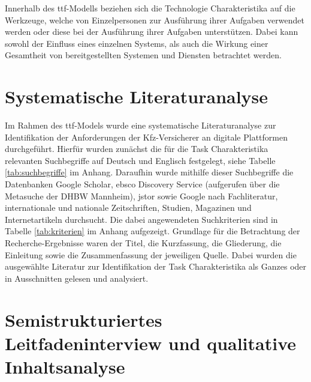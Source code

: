 Innerhalb des \acs{ttf}-Modells beziehen sich die Technologie Charakteristika auf die Werkzeuge, welche von Einzelpersonen zur Ausführung ihrer Aufgaben verwendet werden oder diese bei der Ausführung ihrer Aufgaben unterstützen.\autocite[Vgl.][S. 399]{SPIES2020} Dabei kann sowohl der Einfluss eines einzelnen Systems, als auch die Wirkung einer Gesamtheit von bereitgestellten Systemen und Diensten betrachtet werden. \autocite[Vgl.][S. 216]{GOODHUE1995}





\section{Systematische Literaturanalyse}


Im Rahmen des \acs{ttf}-Models wurde eine systematische Literaturanalyse zur Identifikation der Anforderungen der Kfz-Versicherer an digitale Plattformen durchgeführt. Hierfür wurden zunächst die für die Task Charakteristika relevanten Suchbegriffe auf Deutsch und Englisch festgelegt, siehe Tabelle \ref{tab:suchbegriffe} im Anhang. Daraufhin wurde mithilfe dieser Suchbegriffe die Datenbanken Google Scholar, \ac{ebsco} Discovery Service (aufgerufen über die Metasuche der DHBW Mannheim), \ac{jstor} sowie Google nach Fachliteratur, internationale und nationale Zeitschriften, Studien, Magazinen und Internetartikeln durchsucht. Die dabei angewendeten Suchkriterien sind in Tabelle \ref{tab:kriterien} im Anhang aufgezeigt. Grundlage für die Betrachtung der Recherche-Ergebnisse waren der Titel, die Kurzfassung, die Gliederung, die Einleitung sowie die Zusammenfassung der jeweiligen Quelle. Dabei wurden die ausgewählte Literatur zur Identifikation der Task Charakteristika als Ganzes oder in Ausschnitten gelesen und analysiert. \autocite[Vgl.][]{SOLIS2021}





\section{Semistrukturiertes Leitfadeninterview und qualitative Inhaltsanalyse}

